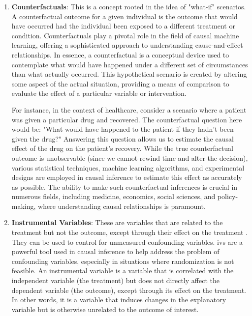 \begin{enumerate}
    \item \textbf{Counterfactuals}: This is a concept rooted in the idea of "what-if" scenarios. A counterfactual outcome for a given individual is the outcome that would have occurred had the individual been exposed to a different treatment or condition.
    Counterfactuals play a pivotal role in the field of causal machine learning, offering a sophisticated approach to understanding cause-and-effect relationships. In essence, a counterfactual is a conceptual device used to contemplate what would have happened under a different set of circumstances than what actually occurred. This hypothetical scenario is created by altering some aspect of the actual situation, providing a means of comparison to evaluate the effect of a particular variable or intervention.

    For instance, in the context of healthcare, consider a scenario where a patient was given a particular drug and recovered. The counterfactual question here would be: "What would have happened to the patient if they hadn't been given the drug?" Answering this question allows us to estimate the causal effect of the drug on the patient's recovery. While the true counterfactual outcome is unobservable (since we cannot rewind time and alter the decision), various statistical techniques, machine learning algorithms, and experimental designs are employed in causal inference to estimate this effect as accurately as possible. The ability to make such counterfactual inferences is crucial in numerous fields, including medicine, economics, social sciences, and policy-making, where understanding causal relationships is paramount.
    
    \item \textbf{Instrumental Variables}: These are variables that are related to the treatment but not the outcome, except through their effect on the treatment \cite{burgessImprovingBiasCoverage2012,daviesIssuesReportingConduct2013}. They can be used to control for unmeasured confounding variables. \Acp{iv} are a powerful tool used in causal inference to help address the problem of confounding variables, especially in situations where randomization is not feasible. An instrumental variable is a variable that is correlated with the independent variable (the treatment) but does not directly affect the dependent variable (the outcome), except through its effect on the treatment. In other words, it is a variable that induces changes in the explanatory variable but is otherwise unrelated to the outcome of interest.
    

\end{enumerate}
